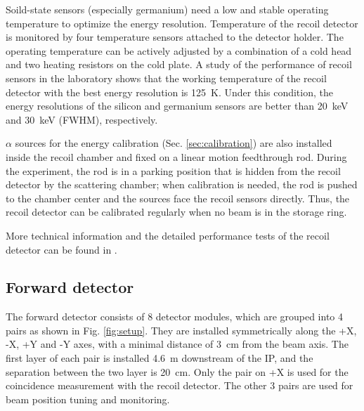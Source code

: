 \documentclass[number,5p]{elsarticle}
\begin{document}
Soild-state sensors (especially germanium) need a low and stable operating
temperature to optimize the energy resolution.
Temperature of the recoil detector is monitored by four temperature sensors
attached to the detector holder.
The operating temperature can be actively adjusted by a combination of a cold head and two heating resistors on the cold plate.
A study of the performance of recoil sensors in the laboratory shows that the
working temperature of the recoil detector with the best energy resolution is \SI{125}{\kelvin}.
Under this condition, the energy resolutions of the silicon and germanium
sensors are better than \SI{20}{\keV} and \SI{30}{\keV} (FWHM), respectively.

$\alpha$ sources for the energy calibration (Sec. \ref{sec:calibration}) are also installed inside the recoil chamber and fixed on a linear motion feedthrough rod.
During the experiment, the rod is in a parking position that is hidden from the
recoil detector by the scattering chamber;
when calibration is needed, the rod is pushed to the chamber center and the sources face the recoil sensors directly.
Thus, the recoil detector can be calibrated regularly when no beam is in the storage ring.

More technical information and the detailed performance tests of the recoil detector can be found in \cite{recoil_article}.

\subsection{Forward detector}
\label{sec:fwd}


The forward detector consists of 8 detector modules, which are
grouped into 4 pairs as shown in Fig. \ref{fig:setup}.
They are installed symmetrically along the +X, -X, +Y and -Y axes, with a minimal distance of \SI{3}{\cm} from the beam axis.
The first layer of each pair is installed \SI{4.6}{\meter} downstream of the IP, and the separation between the two layer is \SI{20}{\cm}.
Only the pair on +X is used for the coincidence measurement with the recoil detector.
The other 3 pairs are used for beam position tuning and monitoring.
\end{document}
